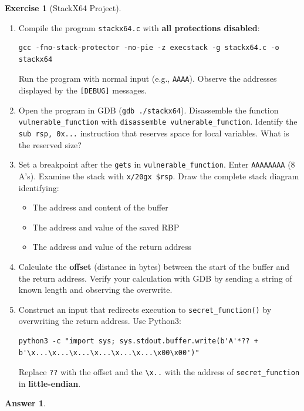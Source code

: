 \documentclass[a4paper,11pt]{article}
\theoremstyle{plain}
\newtheorem{correction}{Answer}
\theoremstyle{definition}
\newtheorem{exercice}{Exercise}
\begin{document}
\begin{exercice}[StackX64 Project]
\begin{enumerate}
\item[\textbf{1a)}] Compile the program \texttt{stackx64.c} with \textbf{all protections disabled}:
\begin{lstlisting}[style=GDBStyle]
gcc -fno-stack-protector -no-pie -z execstack -g stackx64.c -o stackx64
\end{lstlisting}
Run the program with normal input (e.g., \texttt{AAAA}). Observe the addresses displayed by the \texttt{[DEBUG]} messages.

\item[\textbf{1b)}] Open the program in GDB (\texttt{gdb ./stackx64}). Disassemble the function \texttt{vulnerable\_function} with \texttt{disassemble vulnerable\_function}. Identify the \texttt{sub rsp, 0x...} instruction that reserves space for local variables. What is the reserved size?

\item[\textbf{1c)}] Set a breakpoint after the \texttt{gets} in \texttt{vulnerable\_function}. Enter \texttt{AAAAAAAA} (8 A's). Examine the stack with \texttt{x/20gx \$rsp}. Draw the complete stack diagram identifying:
\begin{itemize}
    \item The address and content of the buffer
    \item The address and value of the saved RBP
    \item The address and value of the return address
\end{itemize}

\item[\textbf{1d)}] Calculate the \textbf{offset} (distance in bytes) between the start of the buffer and the return address. Verify your calculation with GDB by sending a string of known length and observing the overwrite.

\item[\textbf{1e)}] Construct an input that redirects execution to \texttt{secret\_function()} by overwriting the return address. Use Python3:
\begin{lstlisting}[style=GDBStyle]
python3 -c "import sys; sys.stdout.buffer.write(b'A'*?? + b'\x...\x...\x...\x...\x...\x...\x00\x00')"
\end{lstlisting}
Replace \texttt{??} with the offset and the \texttt{\textbackslash x..} with the address of \texttt{secret\_function} in \textbf{little-endian}.
\end{enumerate}

\begin{correction}


\end{correction}
\end{exercice}
\end{document}
